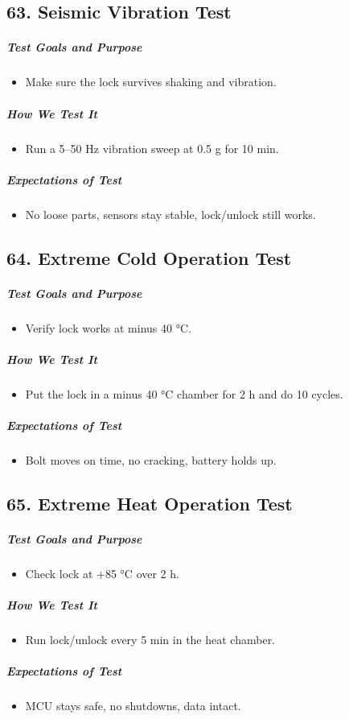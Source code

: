 \subsection*{63. Seismic Vibration Test}
\subparagraph{Test Goals and Purpose}
\begin{itemize}
    \item Make sure the lock survives shaking and vibration.
\end{itemize}
\subparagraph{How We Test It}
\begin{itemize}
    \item Run a 5–50 Hz vibration sweep at 0.5 g for 10 min.
\end{itemize}
\subparagraph{Expectations of Test}
\begin{itemize}
    \item No loose parts, sensors stay stable, lock/unlock still works.
\end{itemize}

\subsection*{64. Extreme Cold Operation Test}
\subparagraph{Test Goals and Purpose}
\begin{itemize}
    \item Verify lock works at minus 40 °C.
\end{itemize}
\subparagraph{How We Test It}
\begin{itemize}
    \item Put the lock in a minus 40 °C chamber for 2 h and do 10 cycles.
\end{itemize}
\subparagraph{Expectations of Test}
\begin{itemize}
    \item Bolt moves on time, no cracking, battery holds up.
\end{itemize}

\subsection*{65. Extreme Heat Operation Test}
\subparagraph{Test Goals and Purpose}
\begin{itemize}
    \item Check lock at +85 °C over 2 h.
\end{itemize}
\subparagraph{How We Test It}
\begin{itemize}
    \item Run lock/unlock every 5 min in the heat chamber.
\end{itemize}
\subparagraph{Expectations of Test}
\begin{itemize}
    \item MCU stays safe, no shutdowns, data intact.
\end{itemize}


